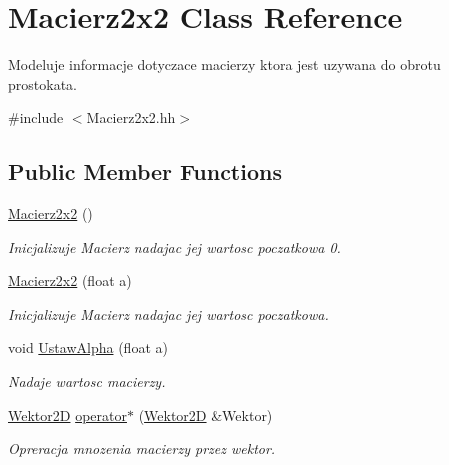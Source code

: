\hypertarget{class_macierz2x2}{\section{Macierz2x2 Class Reference}
\label{class_macierz2x2}
}


Modeluje informacje dotyczace macierzy ktora jest uzywana do obrotu prostokata.  




{\ttfamily \#include $<$Macierz2x2.\+hh$>$}

\subsection*{Public Member Functions}
\begin{DoxyCompactItemize}
\item 
\hypertarget{class_macierz2x2_acbcea1b811870ddce0e439b2837a1a49}{\hyperlink{class_macierz2x2_acbcea1b811870ddce0e439b2837a1a49}{Macierz2x2} ()}\label{class_macierz2x2_acbcea1b811870ddce0e439b2837a1a49}

\begin{DoxyCompactList}\small\item\em Inicjalizuje Macierz nadajac jej wartosc poczatkowa 0. \end{DoxyCompactList}\item 
\hyperlink{class_macierz2x2_a861f1d0e78cf346396bc30ac3af28fce}{Macierz2x2} (float a)
\begin{DoxyCompactList}\small\item\em Inicjalizuje Macierz nadajac jej wartosc poczatkowa. \end{DoxyCompactList}\item 
void \hyperlink{class_macierz2x2_a78dcdc542f77a97fcac7ab017ef39f7d}{Ustaw\+Alpha} (float a)
\begin{DoxyCompactList}\small\item\em Nadaje wartosc macierzy. \end{DoxyCompactList}\item 
\hypertarget{class_macierz2x2_a34c7c81191d2bf8d447cafc86fb3ec42}{\hyperlink{class_wektor2_d}{Wektor2\+D} \hyperlink{class_macierz2x2_a34c7c81191d2bf8d447cafc86fb3ec42}{operator$\ast$} (\hyperlink{class_wektor2_d}{Wektor2\+D} \&Wektor)}\label{class_macierz2x2_a34c7c81191d2bf8d447cafc86fb3ec42}

\begin{DoxyCompactList}\small\item\em Opreracja mnozenia macierzy przez wektor. \end{DoxyCompactList}\end{DoxyCompactItemize}
